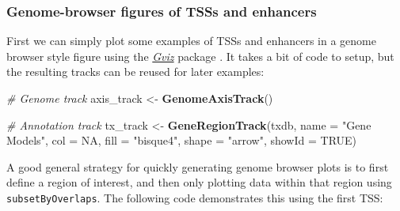 \documentclass[9pt,a4paper,]{extarticle}
\newenvironment{Shaded}{\begin{snugshade}}{\end{snugshade}}
\newcommand{\KeywordTok}[1]{\textcolor[rgb]{0.13,0.29,0.53}{\textbf{{#1}}}}
\newcommand{\DataTypeTok}[1]{\textcolor[rgb]{0.13,0.29,0.53}{{#1}}}
\newcommand{\DecValTok}[1]{\textcolor[rgb]{0.00,0.00,0.81}{{#1}}}
\newcommand{\StringTok}[1]{\textcolor[rgb]{0.31,0.60,0.02}{{#1}}}
\newcommand{\CommentTok}[1]{\textcolor[rgb]{0.56,0.35,0.01}{\textit{{#1}}}}
\newcommand{\OtherTok}[1]{\textcolor[rgb]{0.56,0.35,0.01}{{#1}}}
\newcommand{\NormalTok}[1]{{#1}}
\begin{document}
\subsubsection{Genome-browser figures of TSSs and enhancers}\label{genome-browser-figures-of-tsss-and-enhancers}

First we can simply plot some examples of TSSs and enhancers in a genome browser style figure using the \emph{\href{https://bioconductor.org/packages/3.8/Gviz}{Gviz}} package \citep{Hahne2016}. It takes a bit of code to setup, but the resulting tracks can be reused for later examples:

\begin{Shaded}
\begin{Highlighting}[]
\CommentTok{# Genome track}
\NormalTok{axis_track <-}\StringTok{ }\KeywordTok{GenomeAxisTrack}\NormalTok{()}

\CommentTok{# Annotation track}
\NormalTok{tx_track <-}\StringTok{ }\KeywordTok{GeneRegionTrack}\NormalTok{(txdb, }
                            \DataTypeTok{name =} \StringTok{"Gene Models"}\NormalTok{, }
                            \DataTypeTok{col =} \OtherTok{NA}\NormalTok{,}
                            \DataTypeTok{fill =} \StringTok{"bisque4"}\NormalTok{, }
                            \DataTypeTok{shape =} \StringTok{"arrow"}\NormalTok{, }
                            \DataTypeTok{showId =} \OtherTok{TRUE}\NormalTok{)}
\end{Highlighting}
\end{Shaded}

A good general strategy for quickly generating genome browser plots is to first define a region of interest, and then only plotting data within that region using \texttt{subsetByOverlaps}. The following code demonstrates this using the first TSS:

\begin{Shaded}
\end{Shaded}
\end{document}
